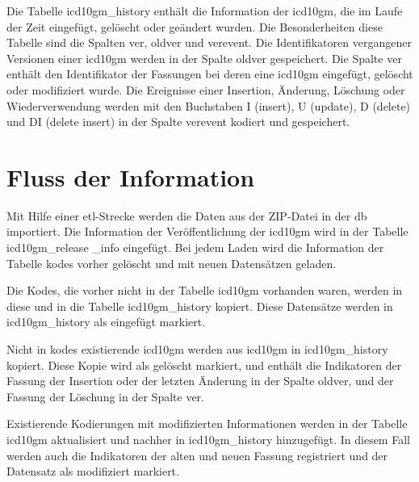 Die Tabelle \glqq\textsf{icd10gm\_history}\grqq{} enthält die Information der \ac{icd10gm}, die im Laufe der Zeit eingefügt, gelöscht oder geändert wurden. Die Besonderheiten diese Tabelle sind die Spalten \glqq\textsf{ver}\grqq{}, \glqq\textsf{oldver}\grqq{} und \glqq\textsf{verevent}\grqq{}. Die Identifikatoren vergangener Versionen einer \ac{icd10gm} werden in der Spalte \glqq\textsf{oldver}\grqq{} gespeichert. Die Spalte \glqq\textsf{ver}\grqq{} enthält den Identifikator der Fassungen bei deren eine \ac{icd10gm} eingefügt, gelöscht oder modifiziert wurde. Die Ereignisse einer Insertion, Änderung, Löschung oder Wiederverwendung werden mit den Buchstaben \glqq\textsf{I}\grqq{} (insert), \glqq\textsf{U}\grqq{} (update), \glqq\textsf{D}\grqq{} (delete) und \glqq\textsf{DI}\grqq{} (delete insert) in der Spalte \glqq\textsf{verevent}\grqq{} kodiert und gespeichert.

\section{Fluss der Information} \label{sec:dbrun}

Mit Hilfe einer \ac{etl}-Strecke werden die Daten aus der ZIP-Datei in der \ac{db} importiert. Die Information der Veröffentlichung der \ac{icd10gm} wird in der Tabelle \glqq\textsf{icd10gm\_release \_info}\grqq{} eingefügt. Bei jedem Laden wird die Information der Tabelle \glqq\textsf{kodes}\grqq{} vorher gelöscht und mit neuen Datensätzen geladen. 

Die Kodes, die vorher nicht in der Tabelle \glqq\textsf{icd10gm}\grqq{} vorhanden waren, werden in diese und in die Tabelle \glqq\textsf{icd10gm\_history}\grqq{} kopiert. Diese Datensätze werden in \glqq\textsf{icd10gm\_history}\grqq{} als eingefügt markiert. 

Nicht in \glqq\textsf{kodes}\grqq{} existierende \ac{icd10gm} werden aus \glqq\textsf{icd10gm}\grqq{} in \glqq\textsf{icd10gm\_history}\grqq{} kopiert. Diese Kopie wird als gelöscht markiert, und enthält die Indikatoren der Fassung der Insertion oder der letzten Änderung in der Spalte \glqq\textsf{oldver}\grqq{}, und der Fassung der Löschung in der Spalte \glqq\textsf{ver}\grqq{}. 

Existierende Kodierungen mit modifizierten Informationen werden in der Tabelle \glqq\textsf{icd10gm}\grqq{} aktualisiert und nachher in \glqq\textsf{icd10gm\_history}\grqq{} hinzugefügt. In diesem Fall werden auch die Indikatoren der alten und neuen Fassung registriert und der Datensatz als modifiziert markiert.

